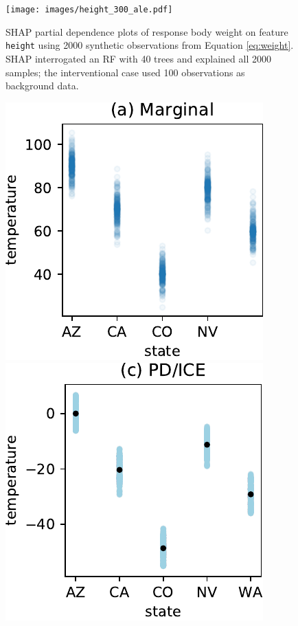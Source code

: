 \documentclass{article}
\begin{document}
\begin{figure}[htbp]
\begin{center}
\texttt{[image: images/height\_300\_ale.pdf]}~~
\caption{\small SHAP partial dependence plots of response body weight on feature {\tt height} using 2000 synthetic observations from Equation \eqref{eq:weight}. SHAP interrogated an RF with 40 trees and explained all 2000 samples; the interventional case used 100 observations as background data.}
\label{fig:heightweight}
\end{center}
\end{figure}

\begin{figure}[htbp]
\begin{center}
\includegraphics[scale=0.4]{images/state_vs_temp.pdf}~~
\includegraphics[scale=0.4]{images/state_vs_temp_pdp.pdf}~~

\end{center}
\end{figure}
\end{document}
